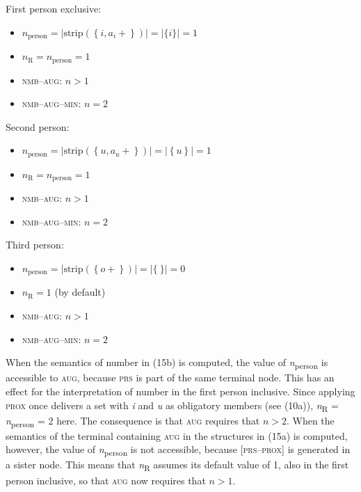 \documentclass[output=paper]{langsci/langscibook}
\begin{document}
  \ex First person exclusive: \\

\begin{itemize}
\item $n_{\text{person}}  =  \big|\text{strip}\left(\left\{i, a_{i}+\right\}\right)\big|  =  \big|\{i\}\big|  =  1$
\item $n_{\text{R}}  =  n_{\text{person}}  =  1$
\item \textsc{nmb}–\textsc{aug}: $n > 1$
\item \textsc{nmb}–\textsc{aug}–\textsc{min}: $n = 2$
\end{itemize}

  \ex Second person: \\

\begin{itemize}
\item $n_{\text{person}} = \big|\text{strip}\left(\left\{u, a_{u}+\right\}\right)\big|  =  \big|\left\{u\right\}\big|  =  1$
\item $n_{\text{R}}  =  n_{\text{person}}  =  1$
\item \textsc{nmb}–\textsc{aug}: $n > 1$
\item \textsc{nmb}–\textsc{aug}–\textsc{min}: $n = 2$
\end{itemize}

  \ex Third person:\\

\begin{itemize}
\item $n_{\text{person}} = \big|\text{strip}\left(\left\{o+\right\}\right)\big|  =  \big|\{\ \}\big|  =  0$
\item $n_{\text{R}}  =  1$ (by default)
\item \textsc{nmb}–\textsc{aug}: $n > 1$
\item \textsc{nmb}–\textsc{aug}–\textsc{min}: $n = 2$
\end{itemize}
\z
\z

When the semantics of number in (15b) is computed, the value of \textit{n}\textsubscript{person} is accessible to \textsc{aug}, because \textsc{prs} is part of the same terminal node. This has an effect for the interpretation of number in the first person inclusive. Since applying \textsc{prox} once delivers a set with \textit{i} and \textit{u} as obligatory members (see (10a)), \textit{n}\textsubscript{R} = \textit{n}\textsubscript{person} = 2 here. The consequence is that \textsc{aug} requires that $n > 2$. When the semantics of the terminal containing \textsc{aug} in the structures in (15a) is computed, however, the value of \textit{n}\textsubscript{person} is not accessible, because [\textsc{prs}–\textsc{prox}] is generated in a sister node. This means that \textit{n}\textsubscript{R} assumes its default value of 1, also in the first person inclusive, so that \textsc{aug} now requires that $n > 1$.
\end{document}
